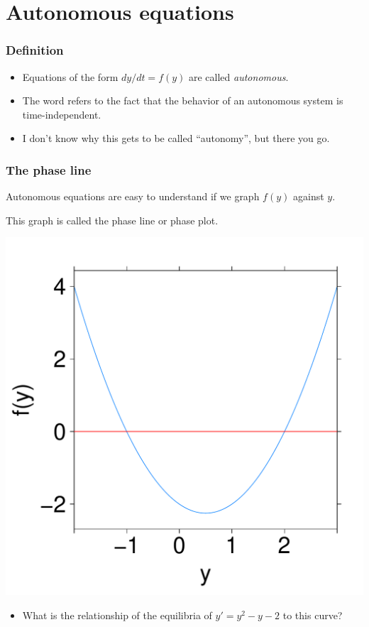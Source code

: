 \documentclass[11pt,ignorenonframetext,]{beamer}
\begin{document}
\section{Autonomous equations}

\begin{frame}\frametitle{Definition}

\begin{itemize}[<+->]
\itemsep1pt\parskip0pt
\item
  Equations of the form $dy/dt = f(y)$ are called \emph{autonomous}.
\item
  The word refers to the fact that the behavior of an autonomous system
  is time-independent.
\item
  I don't know why this gets to be called ``autonomy'', but there you
  go.
\end{itemize}

\end{frame}

\begin{frame}\frametitle{The phase line}

Autonomous equations are easy to understand if we graph $f(y)$ against
$y$.

This graph is called the phase line or phase plot.

\begin{minipage}[t]{0.35\textwidth}
    \includegraphics[width=\linewidth, keepaspectratio=true]{figure/phase.pdf}
\end{minipage}

\hspace{1cm}

\begin{minipage}[t]{0.3\textwidth}
    \begin{itemize}
        \item What is the relationship of the equilibria of $y' = 
        y^2 - y - 2$ to this curve?
    \end{itemize}
\end{minipage}

\end{frame}
\end{document}
